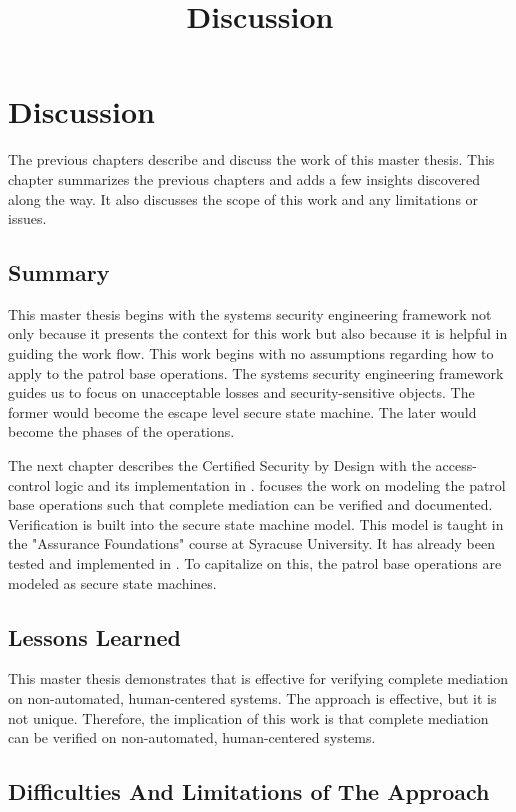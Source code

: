 \documentclass[../../main/main.tex]{subfiles}
\begin{document}
\title{Discussion}

\chapter{Discussion}\label{chp:discussion}

The previous chapters describe and discuss the work of this master thesis. This chapter summarizes the previous chapters and adds a few insights discovered along the way.  It also discusses the scope of this work and any limitations or issues.  

\section{Summary}\label{recap}
This master thesis begins with the systems security engineering framework not only because it presents the context for this work but also because it is helpful in guiding the work flow.  This work begins with no assumptions regarding how to apply  to the patrol base operations.  The systems security engineering framework guides us to focus on unacceptable losses and security-sensitive objects.  The former would become the escape level secure state machine.  The later would become the phases of the operations.  

The next chapter describes the Certified Security by Design with the access-control logic and its implementation in .   focuses the work on modeling the patrol base operations such that complete mediation can be verified and documented.  Verification is built into the secure state machine model.  This model is taught in the "Assurance Foundations" course at Syracuse University.  It has already been tested and implemented in .  To capitalize on this, the patrol base operations are modeled as secure state machines.   

\section{Lessons Learned}\label{missionaccomplished}
This master thesis demonstrates that  is effective for verifying complete mediation on non-automated, human-centered systems.  The  approach is effective, but it is not unique.  Therefore, the implication of this work is that complete mediation can be verified on non-automated, human-centered systems.  


\section{Difficulties And Limitations of The Approach}\label{missionaccomplished}
\end{document}
